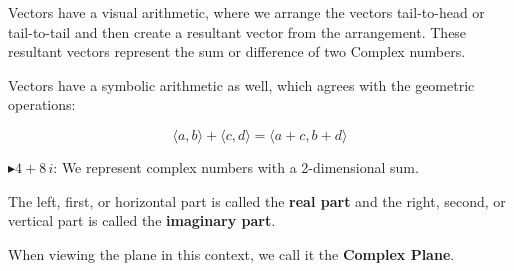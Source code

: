 \documentclass{ximera}
\begin{document}
\begin{image}
\end{image}

Vectors have a visual arithmetic, where we arrange the vectors tail-to-head or tail-to-tail and then create a resultant vector from the arrangement. These resultant vectors represent the sum or difference of two Complex numbers.

Vectors have a symbolic arithmetic as well, which agrees with the geometric operations:

\[
\langle a, b \rangle + \langle c, d \rangle = \langle a+c, b+d \rangle
\]



\textbf{\textcolor{red!90!darkgray}{$\blacktriangleright 4 + 8 \, i$}}: We represent complex numbers with a 2-dimensional sum.



The left, first, or horizontal part is called the \textbf{\textcolor{purple!85!blue}{real part}} and the right, second, or vertical part is called the \textbf{\textcolor{purple!85!blue}{imaginary part}}.



When viewing the plane in this context, we call it the \textbf{\textcolor{purple!85!blue}{Complex Plane}}.
\end{document}
